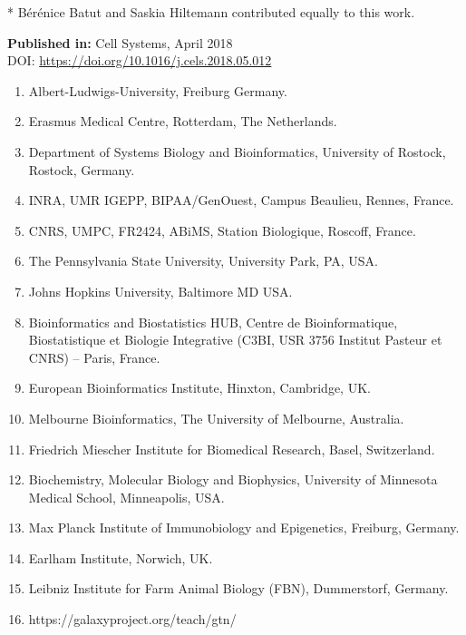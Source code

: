 * Bérénice Batut and Saskia Hiltemann contributed equally to this work.

\textbf{Published in:} Cell Systems, April 2018 \\
DOI: \url{https://doi.org/10.1016/j.cels.2018.05.012}

\small
\begin{enumerate}
\itemsep-0.5em
\item Albert-Ludwigs-University, Freiburg  Germany. \label{affil:freiburg}
\item Erasmus Medical Centre, Rotterdam, The Netherlands. \label{affil:emc2}
\item Department of Systems Biology and Bioinformatics, University of Rostock, Rostock, Germany. \label{affil:rostock}
\item INRA, UMR IGEPP, BIPAA/GenOuest, Campus Beaulieu, Rennes, France. \label{affil:abretaud}
\item CNRS, UMPC, FR2424, ABiMS, Station Biologique, Roscoff, France. \label{affil:roscoff}
\item The Pennsylvania State University, University Park, PA, USA. \label{affil:pennstate}
\item Johns Hopkins University, Baltimore MD USA. \label{affil:hopkins}
\item Bioinformatics and Biostatistics HUB, Centre de Bioinformatique, Biostatistique et Biologie Integrative (C3BI, USR 3756 Institut Pasteur et CNRS) – Paris, France. \label{affil:pasteur}
\item European Bioinformatics Institute, Hinxton, Cambridge, UK. \label{affil:ebi}
\item Melbourne Bioinformatics, The University of Melbourne, Australia. \label{affil:melbourne}
\item Friedrich Miescher Institute for Biomedical Research, Basel, Switzerland. \label{affil:basel}
\item Biochemistry, Molecular Biology and Biophysics, University of Minnesota Medical School, Minneapolis, USA. \label{affil:minnesota}
\item Max Planck Institute of Immunobiology and Epigenetics, Freiburg, Germany. \label{affil:maxplanck}
\item Earlham Institute, Norwich, UK. \label{affil:earlham}
\item Leibniz Institute for Farm Animal Biology (FBN), Dummerstorf, Germany. \label{affil:leibniz}
\item https://galaxyproject.org/teach/gtn/ \label{affil:gtn}


\end{enumerate}
\normalsize



